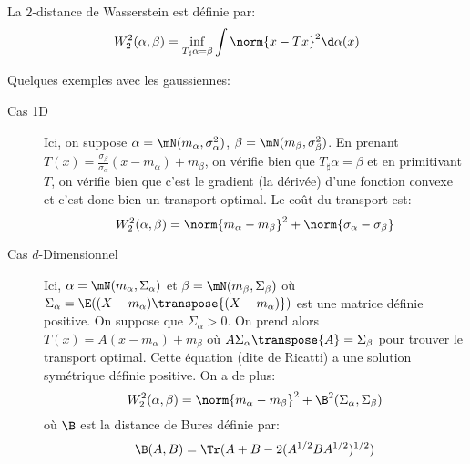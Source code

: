 \begin{definition}
	La $2$-distance de Wasserstein est définie par:
	\begin{equation*}
		W_{2}^{2}(\alpha, \beta) = \inf_{T_{\sharp}\alpha = \beta} \int \norm{x - Tx}^{2}\d\alpha(x)
	\end{equation*}
\end{definition}

Quelques exemples avec les gaussiennes:
\begin{description}
	\item[Cas 1D] Ici, on suppose $\alpha = \mN(m_{\alpha}, \sigma_{\alpha}^{2})$, $\beta = \mN(m_{\beta}, \sigma_{\beta}^{2})$.
	      En prenant $T(x) = \frac{\sigma_{\beta}}{\sigma_{\alpha}}(x - m_{\alpha}) + m_{\beta}$, on vérifie bien que $T_{\sharp}\alpha = \beta$ et en primitivant $T$, on vérifie bien que c'est le gradient (la dérivée) d'une fonction convexe et c'est donc bien un transport optimal.
	      Le coût du transport est:
	      \begin{equation*}
		      W_{2}^{2}(\alpha, \beta) = \norm{m_{\alpha} - m_{\beta}}^{2} + \norm{\sigma_{\alpha} - \sigma_{\beta}}
	      \end{equation*}
	\item[Cas $d$-Dimensionnel] Ici, $\alpha = \mN(m_{\alpha}, \Sigma_{\alpha})$ et $\beta = \mN(m_{\beta}, \Sigma_{\beta})$ où $\Sigma_{\alpha} = \E((X- m_{\alpha})\transpose{(X-m_{\alpha})})$ est une matrice définie positive.
	      On suppose que $\Sigma_{\alpha} > 0$.
	      On prend alors $T(x) = A(x - m_{\alpha}) + m_{\beta}$ où $A\Sigma_{\alpha}\transpose{A} = \Sigma_{\beta}$ pour trouver le transport optimal.
	      Cette équation (dite de Ricatti) a une solution symétrique définie positive.
	      On a de plus:
	      \begin{equation*}
		      W_{2}^{2}(\alpha, \beta) = \norm{m_{\alpha} - m_{\beta}}^{2} + \B^{2}(\Sigma_{\alpha}, \Sigma_{\beta})
	      \end{equation*}
	      où $\B$ est la distance de Bures définie par:
	      \begin{equation*}
		      \B(A, B) = \Tr(A + B - 2(A^{1/2}BA^{1/2})^{1/2})
	      \end{equation*}
\end{description}

